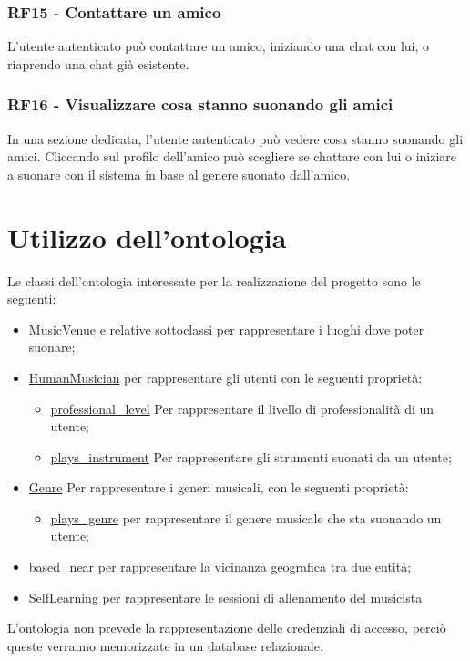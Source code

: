 \documentclass[12pt, a4paper]{article}
\begin{document}
\subsubsection{RF15 - Contattare un amico}

L'utente autenticato può contattare un amico, iniziando una chat con lui, o riaprendo una chat già esistente.

\subsubsection{RF16 - Visualizzare cosa stanno suonando gli amici}

In una sezione dedicata, l'utente autenticato può vedere cosa stanno suonando gli amici. Cliccando sul profilo dell'amico può scegliere se chattare con lui o iniziare a suonare con il sistema in base al genere suonato dall'amico.
\newpage

\section{Utilizzo dell'ontologia}

Le classi dell'ontologia interessate per la realizzazione del progetto sono le seguenti:
\begin{itemize}
    \item \href{https://schema.org/MusicVenue}{MusicVenue} e relative sottoclassi per rappresentare i luoghi dove poter suonare;
    \item \href{http://purl.org/ontology/musico#HumanMusician}{HumanMusician} per rappresentare gli utenti con le seguenti proprietà:
          \begin{itemize}
              \item  \href{http://purl.org/ontology/musico#professional_level}{professional\_level} Per rappresentare il livello di professionalità di un utente;
              \item \href{http://purl.org/ontology/musico#plays_instrument}{plays\_instrument} Per rappresentare gli strumenti suonati da un utente;
          \end{itemize}
    \item \href{http://purl.org/ontology/mo/Genre}{Genre} Per rappresentare i generi musicali, con le seguenti proprietà:
          \begin{itemize}
              \item \href{http://purl.org/ontology/musico\#plays\_genre}{plays\_genre} per rappresentare il genere musicale che sta suonando un utente;
          \end{itemize}
    \item \href{http://xmlns.com/foaf/0.1/based_near}{based\_near} per rappresentare la vicinanza geografica tra due entità;
    \item \href{http://purl.org/ontology/musico/SelfLearning}{SelfLearning} per rappresentare le sessioni di allenamento del musicista
\end{itemize}

L'ontologia non prevede la rappresentazione delle credenziali di accesso, perciò queste verranno memorizzate in un database relazionale.
\end{document}
